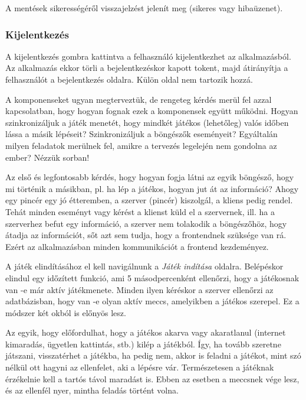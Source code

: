 A mentések sikerességéről visszajelzést jelenít meg (sikeres vagy hibaüzenet).

\subsubsection{Kijelentkezés}
A kijelentkezés gombra kattintva a felhasználó kijelentkezhet az alkalmazásból. Az alkalmazás ekkor törli a bejelentkezéskor kapott tokent, majd átirányítja a felhasználót a bejelentkezés oldalra. Külön oldal nem tartozik hozzá.


A komponenseket ugyan megterveztük, de rengeteg kérdés merül fel azzal kapcsolatban, hogy hogyan fognak ezek a komponensek együtt működni. Hogyan szinkronizáljuk a játék menetét, hogy mindkét játékos (lehetőleg) valós időben lássa a másik lépéseit? Szinkronizáljuk a böngészők eseményeit? Egyáltalán milyen feladatok merülnek fel, amikre a tervezés legelején nem gondolna az ember? Nézzük sorban!

Az első és legfontosabb kérdés, hogy hogyan fogja látni az egyik böngésző, hogy mi történik a másikban, pl. ha lép a játékos, hogyan jut át az információ? Ahogy egy pincér egy jó étteremben, a szerver (pincér) kiszolgál, a kliens pedig rendel. Tehát minden eseményt vagy kérést a klienst küld el a szervernek, ill. ha a szerverhez befut egy információ, a szerver nem tolakodik a böngészőhöz, hogy átadja az információt, sőt azt sem tudja, hogy a frontendnek szüksége van rá. Ezért az alkalmazásban minden kommunikációt a frontend kezdeményez.

A játék elindításához el kell navigálnunk a \textit{Játék indítása} oldalra. Belépéskor elindul egy időzített funkció, ami 5 másodpercenként ellenőrzi, hogy a játékosnak van -e már aktív játékmenete. Minden ilyen kéréskor a szerver ellenőrzi az adatbázisban, hogy van -e olyan aktív meccs, amelyikben a játékos szerepel. Ez a módszer két okból is előnyös lesz.

Az egyik, hogy előfordulhat, hogy a játékos akarva vagy akaratlanul (internet kimaradás, ügyetlen kattintás, stb.) kilép a játékból. Így, ha tovább szeretne játszani, visszatérhet a játékba, ha pedig nem, akkor is feladni a játékot, mint szó nélkül ott hagyni az ellenfelet, aki a lépésre vár. Természetesen a játéknak érzékelnie kell a tartós távol maradást is. Ebben az esetben a meccsnek vége lesz, és az ellenfél nyer, mintha feladás történt volna.


